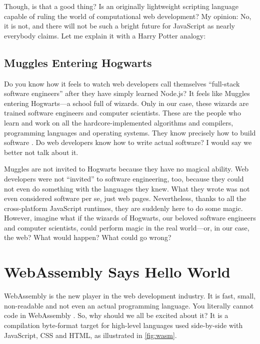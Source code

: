\documentclass[10pt]{article}
\begin{document}
\begin{sloppypar}
  Though, is that a good thing? Is an originally lightweight scripting language capable of ruling the world of computational web development? My opinion: No, it is not, and there will not be such a bright future for JavaScript as nearly everybody claims. Let me explain it with a Harry Potter analogy:

  \subsection{Muggles Entering Hogwarts}
  \label{sec:muggles}

  Do you know how it feels to watch web developers call themselves “full-stack software engineers” after they have simply learned Node.js? It feels like Muggles entering Hogwarts—a school full of wizards. Only in our case, these wizards are trained software engineers and computer scientists. These are the people who learn and work on all the hardcore-implemented algorithms and compilers, programming languages and operating systems. They know precisely how to build software \citep{might_what_2011}. Do web developers know how to write actual software? I would say we better not talk about it.

  Muggles are not invited to Hogwarts because they have no magical ability. Web developers were not “invited” to software engineering, too, because they could not even do something with the languages they knew. What they wrote was not even considered software per se, just web pages. Nevertheless, thanks to all the cross-platform JavaScript runtimes, they are suddenly here to do some magic. However, imagine what if the wizards of Hogwarts, our beloved software engineers and computer scientists, could perform magic in the real world—or, in our case, the web? What would happen? What could go wrong?

  \section{WebAssembly Says Hello World}
  \label{sec:hello-world}

  WebAssembly is the new player in the web development industry. It is fast, small, non-readable and not even an actual programming language. You literally cannot code in WebAssembly \citep{rourke_learn_2018}. So, why should we all be excited about it? It is a compilation byte-format target for high-level languages used side-by-side with JavaScript, CSS and HTML, as illustrated in \autoref{fig:wasm}.


\end{sloppypar}
\end{document}
